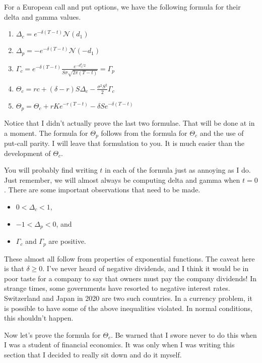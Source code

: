 \documentclass{ximera}
\begin{document}
\begin{theorem}
For a European call and put options, we have the following formula for their delta and gamma values.
	\begin{enumerate}
	\item $\Delta_c=e^{-\delta(T-t)}\mathcal{N}(d_1)$
	\item $\Delta_p=-e^{-\delta(T-t)}\mathcal{N}(-d_1)$
	\item $\Gamma_c=e^{-\delta(T-t)}\frac{e^{-d_1^2/2}}{S\sigma\sqrt{2\pi(T-t)}}=\Gamma_p$
	\item $\Theta_c=rc+(\delta-r)S\Delta_c-\frac{\sigma^2S^2}{2}\Gamma_c$
	\item $\Theta_p=\Theta_c+rKe^{-r(T-t)}-\delta Se^{-\delta(T-t)}$
	\end{enumerate}
\end{theorem}

Notice that I didn't actually prove the last two formulae. That will be done at in a moment. The formula for $\Theta_p$ follows from the formula for $\Theta_c$ and the use of put-call parity. I will leave that formulation to you. It is much easier than the development of $\Theta_c$.

You will probably find writing $t$ in each of the formula just as annoying as I do. Just remember, we will almost always be computing delta and gamma when $t=0$. There are some important observations that need to be made.

\begin{itemize}
\item $0<\Delta_c<1$,\\
\item $-1<\Delta_p<0$, and\\
\item $\Gamma_c$ and $\Gamma_p$ are positive.
\end{itemize}

These almost all follow from properties of exponential functions. The caveat here is that $\delta\geq 0$. I've never heard of negative dividends, and I think it would be in poor taste for a company to say that owners must pay the company dividends! In strange times, some governments have resorted to negative interest rates. Switzerland and Japan in 2020 are two such countries. In a currency problem, it is possible to have some of the above inequalities violated. In normal conditions, this shouldn't happen.

Now let's prove the formula for $\Theta_c$. Be warned that I swore never to do this when I was a student of financial economics. It was only when I was writing this section that I decided to really sit down and do it myself.
\end{document}

